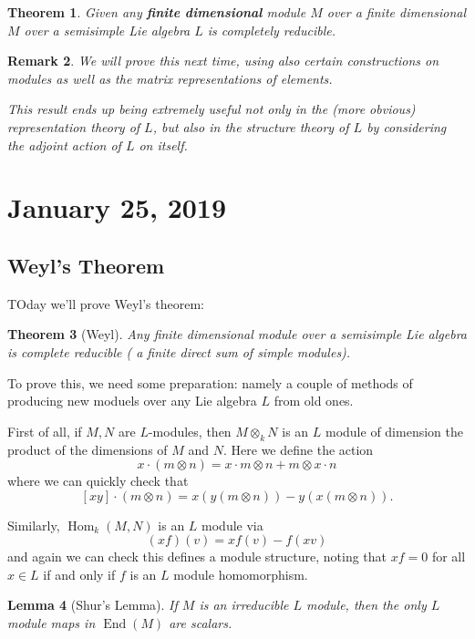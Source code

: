 \documentclass[12pt]{article}
\theoremstyle{nonumberbreak}
\theoremstyle{changebreak}
\newtheorem{thm}{Theorem}[subsection]
\newtheorem{lem}[thm]{Lemma}
\theoremstyle{nonumberbreak}
\theoremstyle{change}
\newtheorem{rmk}[thm]{Remark}
\DeclareMathOperator{\Hom}{Hom}
\begin{document}
\begin{thm}
	Given any \textbf{finite dimensional} module $M$ over a finite dimensional $M$ over a semisimple Lie
	algebra $L$ is completely reducible.
\end{thm}
\begin{rmk}
	We will prove this next time, using also certain constructions on modules as well as the matrix
	representations of elements.

	This result ends up being extremely useful not only in the (more obvious) representation theory of $L$, 
	but also in the structure theory of $L$ by considering the adjoint action of $L$ on itself.
\end{rmk}

\section{January 25, 2019}
\subsection{Weyl's Theorem}
TOday we'll prove Weyl's theorem:
\begin{thm}[Weyl]
	Any finite dimensional module over a semisimple Lie algebra is complete reducible ( a finite direct sum of simple modules).
\end{thm}
To prove this, we need some preparation: namely a couple of methods of producing new moduels over any Lie algebra $L$ from old ones.

First of all, if $M,N$ are $L$-modules, then $M\otimes_k N$ is an $L$ module of dimension the product
of the dimensions of $M$ and $N$. Here we define the action
\[x\cdot(m\otimes n)=x\cdot m\otimes n+m\otimes x\cdot n\]
where we can quickly check that 
\[[xy]\cdot(m\otimes n)=x(y(m\otimes n))-y(x(m\otimes n)).\]

Similarly, $\Hom_k(M,N)$ is an $L$ module via
\[(xf)(v)=xf(v)-f(xv)\]
and again we can check this defines a module structure, noting that $xf=0$ for all $x\in L$ if and only if $f$ is an $L$ module homomorphism.

\begin{lem}[Shur's Lemma]
	If $M$ is an irreducible $L$ module, then the only $L$ module maps in $\operatorname{End}(M)$ are scalars.
\end{lem}
\end{document}
